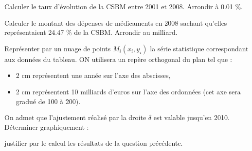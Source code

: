 \begin{questions}
	\question[] Calculer le taux d'évolution de la CSBM entre 2001 et 2008. Arrondir à \num{0.01} \%.
	
	\question[] Calculer le montant des dépenses de médicaments en 2008 sachant qu'elles représentaient \num{24.47}  \% de la CSBM. Arrondir au milliard.
	
	\question[] Représenter par un nuage de points $M_i(x_i, y_i)$ la série statistique correspondant aux données du tableau. ON utilisera un repère orthogonal du plan tel que :
	\begin{itemize}
		\item 2 cm représentent une année sur l'axe des abscisses,
		
		\item 2 cm représentent 10 milliards d'euros sur l'axe des ordonnées (cet axe sera gradué de 100 à 200).
		
	\end{itemize}

	\question[] 
	
		\question[] On admet que l'ajustement réalisé par la droite $\delta$ est valable jusqu'en 2010. Déterminer graphiquement :
		
		\question[] justifier par le calcul les résultats de la question précédente.
\end{questions}